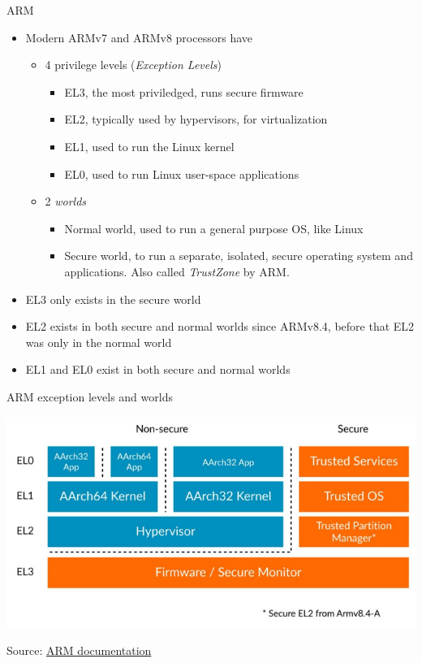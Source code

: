 \begin{frame}{ARM}
  \begin{itemize}
  \item Modern ARMv7 and ARMv8 processors have
    \begin{itemize}
    \item 4 privilege levels ({\em Exception Levels})
      \begin{itemize}
      \item EL3, the most priviledged, runs secure firmware
      \item EL2, typically used by hypervisors, for virtualization
      \item EL1, used to run the Linux kernel
      \item EL0, used to run Linux user-space applications
      \end{itemize}
    \item 2 {\em worlds}
      \begin{itemize}
      \item Normal world, used to run a general purpose OS, like Linux
      \item Secure world, to run a separate, isolated, secure
        operating system and applications. Also called {\em TrustZone}
        by ARM.
      \end{itemize}
    \end{itemize}
  \item EL3 only exists in the secure world
  \item EL2 exists in both secure and normal worlds since ARMv8.4,
    before that EL2 was only in the normal world
  \item EL1 and EL0 exist in both secure and normal worlds
  \end{itemize}
\end{frame}

\begin{frame}{ARM exception levels and worlds}
  \begin{center}
    \includegraphics[height=0.75\textheight]{slides/sysdev-bootloaders-sequence/arm-exception-levels.png}
  \end{center}
  Source: \href{https://developer.arm.com/documentation/102412/0102/Execution-and-Security-states}{ARM documentation}
\end{frame}


